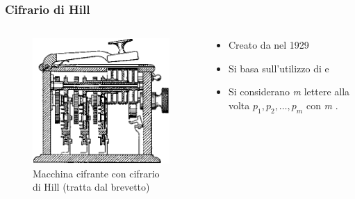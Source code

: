 		\begin{frame}
			\frametitle{Cifrario di Hill}
			\begin{columns}
				\begin{column}{0.4\textwidth}
					\begin{center}
						\begin{figure}
							\includegraphics[width=\columnwidth]{img/Hill.png}
							\caption{Macchina cifrante con cifrario di Hill (tratta dal brevetto)}
						\end{figure}	
					\end{center}
				\end{column}
				\begin{column}{0.6\textwidth}
					\begin{itemize}
						\item Creato da  nel 1929
						\item Si basa sull'utilizzo di  e 
						\item Si considerano \emph{m} lettere alla volta $p_1,p_2,\dots,p_m$ con \emph{m} .
					\end{itemize}
				\end{column}
			\end{columns}	
		\end{frame}
		
